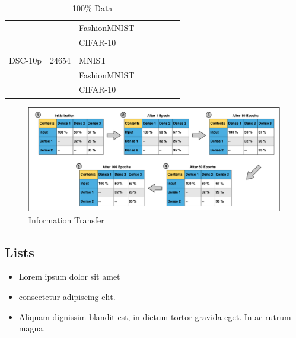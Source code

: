 \documentclass{article}
\begin{document}
\begin{table}[]
\begin{tabular}{@{}llllllll@{}}
                            &                            & FashionMNIST             &                  &              &               &          &                               \\
                            &                            & CIFAR-10                 &                  &              &               &          &                               \\
                            &                            &                          &                  &              &               &          &                               \\
DSC-10p                     & 24654                      & MNIST                    &                  &              &               &          &                               \\
                            &                            & FashionMNIST             &                  &              &               &          &                               \\
                            &                            & CIFAR-10                 &                  &              &               &          &                               \\ \bottomrule
\end{tabular}
\caption{100\% Data}
\label{tab:my-table}
\end{table}



\begin{figure}[h!]
\centering
\includegraphics[scale=0.08]{InfoTransfer.png}
\caption{Information Transfer}
\label{fig:infotransfer}
\end{figure}


\subsection{Lists}
\begin{itemize}
\item Lorem ipsum dolor sit amet
\item consectetur adipiscing elit. 
\item Aliquam dignissim blandit est, in dictum tortor gravida eget. In ac rutrum magna.
\end{itemize}
\end{document}
